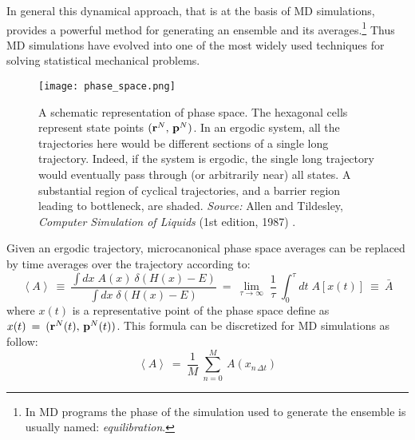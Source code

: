 In general this dynamical approach, that is at the basis of MD simulations, provides a powerful method for generating an ensemble and its averages.\footnote{In MD programs the phase of the simulation used to generate the ensemble is usually named: \textit{equilibration}.} Thus MD simulations have evolved into one of the most widely used techniques for solving statistical mechanical problems.

\begin{figure}[H]
\centering
\begin{minipage}[t]{0.75\textwidth}
	\centering
    \texttt{[image: phase\_space.png]}
    
    \footnotesize{\caption{A schematic representation of phase space. The hexagonal cells represent state points $( \bold{r}^N, \, \bold{p}^N )$. In an ergodic system, all the trajectories here would be different sections of a single long trajectory. Indeed, if the system is ergodic, the single long trajectory would eventually pass through (or arbitrarily near) all states. A substantial region of cyclical trajectories, and a barrier region leading to bottleneck, are shaded. 
    \textit{Source:} Allen and Tildesley, \textit{Computer Simulation of Liquids} (1st edition, 1987) 
    \cite{ref:AllenTildesley_1ed}.}
    \label{fig:generation-of-microcan_state}
    }
\end{minipage} 
\end{figure}

Given an ergodic trajectory, microcanonical phase space averages can be replaced by time averages over the trajectory according to:
\begin{equation}\label{eq:stat_mean_val}
\left< A \right> \:\equiv\: 
\frac{\int dx \; A(x) \: \delta(H (x) - E)}{\int dx \; \delta(H (x) - E)} \:=\: 
\lim_{\tau \rightarrow \infty} \; \frac{1}{\tau} \: \int_0^\tau dt \; A[x(t)] \:\equiv\: \bar{A}
\end{equation}
where $x(t)$ is a representative point of the phase space define as $x(t) \:=\: ( \bold{r}^N(t), \, \bold{p}^N(t) )$. 
This formula can be discretized for MD simulations as follow:
\begin{equation}\label{eq:stat_mean_val-discr}
\left< A \right> \:=\: \frac{1}{M} \: \sum_{n = 0}^M \: A(x_{n \, \Delta t})
\end{equation}

